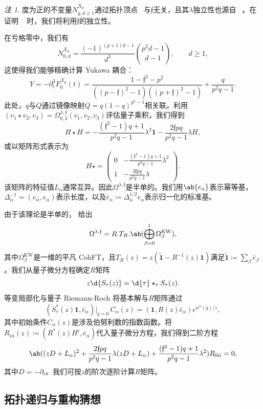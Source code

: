 \documentclass{amsart}
\theoremstyle{definition}
\theoremstyle{remark}
\newtheorem{rmk}[thm]{注}
\theoremstyle{plain}
\theoremstyle{definition}
\theoremstyle{remark}
\newcommand{\mf}[1]{\mathfrak{#1}}
\newcommand{\mr}[1]{\mathrm{#1}}
\newcommand{\wt}[1]{\widetilde{#1}}
\newcommand{\1}{\mathbf{1}}
\newcommand{\2}{\mathbf{2}}
\newcommand{\3}{\mathbf{3}}
\begin{document}
\begin{rmk}
    度为正的不变量\(N^{X_p}_{g,d\geq1}\)通过拓扑顶点~\cite{LLLZ2009} 与\(\mf{f}\)无关，且其\(\lambda\)独立性也源自 ~。在证明 ~ 时，我们将利用\(\mf{f}\)的独立性。
\end{rmk}

在亏格零中，我们有
\[ N^{X_p}_{0,d} = \frac{(-1)^{(p+1)d-1}}{d^3}\binom{p^2d-1}{d-1}, \qquad d \geq 1, \]
这使得我们能够精确计算 Yukawa 耦合：
\[ Y = -\partial_t^3 F_0^{X_p}(t) = \frac{1-\mf{f}^2-p^2}{((p-\mf{f})^2-1)((p+\mf{f})^2-1)} + \frac{q}{p^2q-1}. \]
此处，\(q\)与\(Q\)通过镜像映射\(Q = q(1-q)^{p^2-1}\)相关联。利用\((v_1 \star v_2, v_3) = \Omega^{\lambda,\mf{f}}_{0,3}(v_1,v_2,v_3)\)评估量子乘积，我们得到
\[ H \star H = -\frac{(\mf{f}^2-1)q+1}{p^2q-1}\lambda^2 \1 - \frac{2\mf{f}pq}{p^2q-1}\lambda H, \]
或以矩阵形式表示为
\[ H \star = \begin{pmatrix} 0 & -\frac{(\mf{f}^2-1)q+1}{p^2q-1}\lambda^2 \\ 1 & -\frac{2\mf{f}pq}{p^2q-1}\lambda \end{pmatrix}. \]
该矩阵的特征值\(L_{\alpha}\)通常互异。因此\(\Omega^{\lambda,\mf{f}}\)是半单的。我们用\(\ab\{e_{\alpha}\}\)表示幂等基，\(\Delta_{\alpha}^{-1} = (e_{\alpha},e_{\alpha})\)表示长度，以及\(\bar{e}_{\alpha} \coloneqq \Delta_{\alpha}^{1/2}e_{\alpha}\)表示归一化的标准基。

由于该理论是半单的， 给出
\[ \Omega^{\lambda,\mf{f}} = R.T_R.\ab(\bigoplus_{\beta=0}^1 \Omega^{\mr{KW}}_{\beta}), \]
其中\(\Omega^{\mr{KW}}_{\beta}\)是一维的平凡 CohFT，且\(T_R(z) = z(\wt{\1}-R^{-1}(z)\1)\)满足\(\wt{\1} \coloneqq \sum_{\beta}\bar{e}_{\beta}\)。我们从量子微分方程确定\(R\)矩阵
\[ z \d{S_{\tau}(z)} = \d{\tau} \star_{\tau} S_{\tau}(z). \]
等变局部化与量子 Riemann-Roch 将基本解与\(R\)矩阵通过
\[ (S^*_{\tau}(z)\1, \bar{e}_{\alpha})\big|_{q=0}\, C_{\alpha}(z) = (\1, R(z)\bar{e}_{\alpha})e^{u^{\alpha}(q)/z}, \]
其中初始条件\(C_{\alpha}(z)\)是涉及伯努利数的指数函数。将\(R_{i\bar{\alpha}}(z) \coloneqq (R^*(z)H^i, \bar{e}_{\alpha})\)代入量子微分方程，我们得到二阶方程
\[ \ab( (zD+L_{\alpha})^2 + \frac{2\mf{f}pq}{p^2q-1}\lambda(zD+L_{\alpha}) + \frac{(\mf{f}^2-1)q+1}{p^2q-1}\lambda^2 )R_{0\bar{\alpha}} = 0, \]
其中\(D = -\partial_t\)。我们可按\(z\)的阶次逐阶计算\(R\)矩阵。

\subsection{拓扑递归与重构猜想}%
\label{sub:Topological recursion and the remodeling conjecture}
\end{document}
